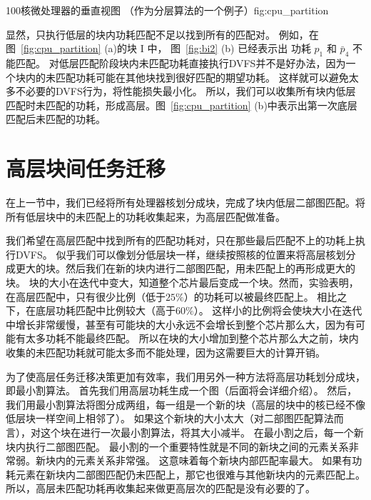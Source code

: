 \begin{pics}[h]{100核微处理器的垂直视图 （作为分层算法的一个例子）}{fig:cpu_partition}
  \centering

\end{pics}

显然，只执行低层的块内功耗匹配不足以找到所有的匹配对。
例如，在图~\ref{fig:cpu_partition} (a)的块 I 中， 图~\ref{fig:bi2} (b) 已经表示出
功耗 $p_1$ 和 $\bar{p}_4$ 不能匹配。
对低层匹配阶段块内未匹配功耗直接执行DVFS并不是好办法，因为一个块内的未匹配功耗可能在其他块找到很好匹配的期望功耗。
这样就可以避免太多不必要的DVFS行为，将性能损失最小化。
所以，我们可以收集所有块内低层匹配时未匹配的功耗，形成高层。图~\ref{fig:cpu_partition} (b)中表示出第一次底层匹配后未匹配的功耗。

\section{高层块间任务迁移}\label{sec:fm}

在上一节中，我们已经将所有处理器核划分成块，完成了块内低层二部图匹配。将所有低层块中的未匹配上的功耗收集起来，为高层匹配做准备。

我们希望在高层匹配中找到所有的匹配功耗对，只在那些最后匹配不上的功耗上执行DVFS。
似乎我们可以像划分低层块一样，继续按照核的位置来将高层核划分成更大的块。然后我们在新的块内进行二部图匹配，用未匹配上的再形成更大的块。
块的大小在迭代中变大，知道整个芯片最后变成一个块。然而，实验表明，在高层匹配中，只有很少比例（低于$25\%$）的功耗可以被最终匹配上。
相比之下，在底层功耗匹配中比例较大（高于$60\%$）。
这样小的比例将会使块大小在迭代中增长非常缓慢，甚至有可能块的大小永远不会增长到整个芯片那么大，因为有可能有太多功耗不能最终匹配。
所以在块的大小增加到整个芯片那么大之前，块内收集的未匹配功耗就可能太多而不能处理，因为这需要巨大的计算开销。

为了使高层任务迁移决策更加有效率，我们用另外一种方法将高层功耗划分成块，即最小割算法。
首先我们用高层功耗生成一个图（后面将会详细介绍）。
然后，我们用最小割算法将图分成两组，每一组是一个新的块（高层的块中的核已经不像低层块一样空间上相邻了）。
如果这个新块的大小太大（对二部图匹配算法而言），对这个块在进行一次最小割算法，将其大小减半。
在最小割之后，每一个新块内执行二部图匹配。
最小割的一个重要特性就是不同的新块之间的元素关系非常弱。新块内的元素关系非常强。
这意味着每个新块内部匹配率最大。
如果有功耗元素在新块内二部图匹配仍未匹配上，那它也很难与其他新块内的元素匹配上。
所以，高层未匹配功耗再收集起来做更高层次的匹配是没有必要的了。

